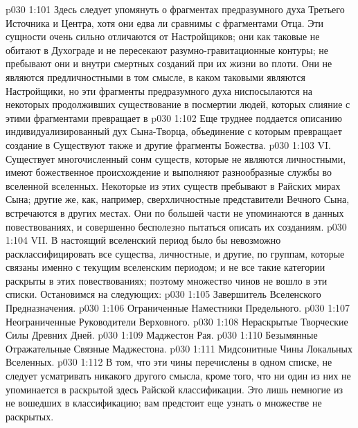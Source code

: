 \vs p030 1:101 Здесь следует упомянуть о фрагментах предразумного духа Третьего Источника и Центра, хотя они едва ли сравнимы с фрагментами Отца. Эти сущности очень сильно отличаются от Настройщиков; они как таковые не обитают в Духограде и не пересекают разумно\hyp{}гравитационные контуры; не пребывают они и внутри смертных созданий при их жизни во плоти. Они не являются предличностными в том смысле, в каком таковыми являются Настройщики, но эти фрагменты предразумного духа ниспосылаются на некоторых продолживших существование в посмертии людей, которых слияние с этими фрагментами превращает в 
\vs p030 1:102 Еще труднее поддается описанию индивидуализированный дух Сына\hyp{}Творца, объединение с которым превращает создание в  Существуют также и другие фрагменты Божества.
\vs p030 1:103 \pc VI.  Существует многочисленный сонм существ, которые не являются личностными, имеют божественное происхождение и выполняют разнообразные службы во вселенной вселенных. Некоторые из этих существ пребывают в Райских мирах Сына; другие же, как, например, сверхличностные представители Вечного Сына, встречаются в других местах. Они по большей части не упоминаются в данных повествованиях, и совершенно бесполезно пытаться описать их  созданиям.
\vs p030 1:104 \pc VII.   В настоящий вселенский период было бы невозможно расклассифицировать все существа, личностные, и другие, по группам, которые связаны именно с текущим вселенским периодом; и не все такие категории раскрыты в этих повествованиях; поэтому множество чинов не вошло в эти списки. Остановимся на следующих:
\vs p030 1:105 Завершитель Вселенского Предназначения.
\vs p030 1:106 Ограниченные Наместники Предельного.
\vs p030 1:107 Неограниченные Руководители Верховного.
\vs p030 1:108 Нераскрытые Творческие Силы Древних Дней.
\vs p030 1:109 Маджестон Рая.
\vs p030 1:110 Безымянные Отражательные Связные Маджестона.
\vs p030 1:111 Мидсонитные Чины Локальных Вселенных.
\vs p030 1:112 \pc В том, что эти чины перечислены в одном списке, не следует усматривать никакого другого смысла, кроме того, что ни один из них не упоминается в раскрытой здесь Райской классификации. Это лишь немногие из не вошедших в классификацию; вам предстоит еще узнать о множестве не раскрытых.
